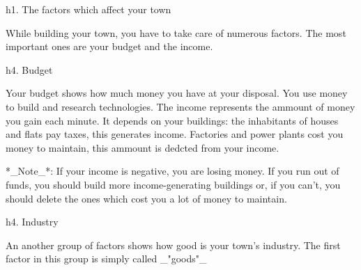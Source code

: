 

h1. The factors which affect your town


While building your town, you have to take care of numerous factors. The most important ones are your budget and the income.


h4. Budget

Your budget shows how much money you have at your disposal. You use money to build and research technologies. The income represents the ammount of money you gain each minute. It depends on your buildings: the inhabitants of houses and flats pay taxes, this generates income. Factories and power plants cost you money to maintain, this ammount is dedcted from your income.

*_Note_*: If your income is negative, you are losing money. If you run out of funds, you should build more income-generating buildings or, if you can't, you should delete the ones which cost you a lot of money to maintain.

h4. Industry

An another group of factors shows how good is your town's industry.
The first factor in this group is simply called _"goods"_
